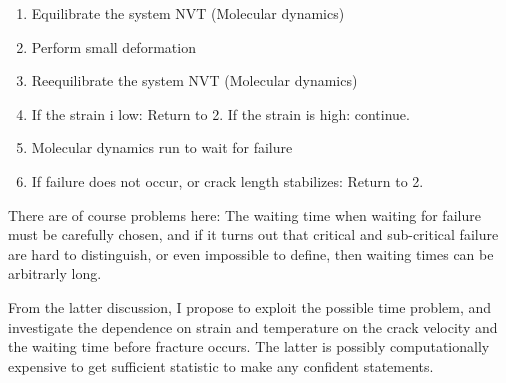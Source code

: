 \begin{enumerate}
\item Equilibrate the system NVT (Molecular dynamics)
\item Perform small deformation
\item Reequilibrate the system NVT (Molecular dynamics)
\item If the strain i low: Return to 2. If the strain is high: continue.
\item Molecular dynamics run to wait for failure
\item If failure does not occur, or crack length stabilizes: Return to 2. 
\end{enumerate}

There are of course problems here: The waiting time when waiting for failure must be carefully chosen, and if it turns out that critical and sub-critical failure are hard to distinguish, or even impossible to define, then waiting times can be arbitrarly long. 

From the latter discussion, I propose to exploit the possible time problem, and investigate the dependence on strain and temperature on the crack velocity and the waiting time before fracture occurs. The latter is possibly computationally expensive to get sufficient statistic to make any confident statements. 
